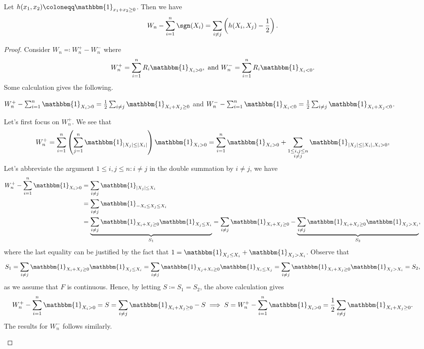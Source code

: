 \begin{proposition}\label{prop:Wilcoxon-signed-rank-test}
	Let \(h(x_1, x_2) \coloneqq \mathbbm{1}_{x_1 + x_2 \geq 0}\). Then we have
	\[
		W_n - \sum_{i=1}^{n} \sgn (X_i)
		= \sum_{i \neq j} \left( h(X_i , X_j) - \frac{1}{2} \right).
	\]
\end{proposition}
\begin{proof}
	Consider \(W_n \eqqcolon W_n^+ - W_n^-\) where
	\[
		W_n^+ = \sum_{i=1}^{n} R_i \mathbbm{1}_{X_i > 0} ,\text{ and }
		W_n^- = \sum_{i=1}^{n} R_i \mathbbm{1}_{X_i < 0}.
	\]
	Some calculation gives the following.

	\begin{claim}
		\(W_n^+ - \sum_{i=1}^{n} \mathbbm{1}_{X_i > 0} = \frac{1}{2} \sum_{i \neq j} \mathbbm{1}_{X_i + X_j \geq 0}\) and \(W_n^- - \sum_{i=1}^{n} \mathbbm{1}_{X_i < 0} = \frac{1}{2} \sum_{i \neq j} \mathbbm{1}_{X_i + X_j < 0}\).
	\end{claim}
	\begin{explanation}
		Let's first focus on \(W_n^+\). We see that
		\[
			W_n^+
			= \sum_{i=1}^{n} \left( \sum_{j=1}^{n} \mathbbm{1}_{\vert X_j \vert \leq \vert X_i \vert } \right) \mathbbm{1}_{X_i > 0}
			= \sum_{i=1}^{n} \mathbbm{1}_{X_i > 0} + \sum_{\substack{1 \leq i, j \leq n \\ i \neq j}} \mathbbm{1}_{\vert X_j \vert \leq \vert X_i \vert , X_i > 0} ,
		\]
		Let's abbreviate the argument \(1 \leq i, j \leq n \colon i \neq j\) in the double summation by \(i \neq j\), we have
		\[
			\begin{split}
				W_n^+ - \sum_{i=1}^{n} \mathbbm{1}_{X_i > 0}
				 & = \sum_{i \neq j} \mathbbm{1}_{\vert X_j \vert \leq X_i}                                       \\
				 & = \sum_{i \neq j} \mathbbm{1}_{-X_i \leq X_j \leq X_i}                                         \\
				 & = \underbrace{\sum_{i \neq j} \mathbbm{1}_{X_i + X_j \geq 0} \mathbbm{1}_{X_j \leq X_i}}_{S_1}
				= \sum_{i \neq j} \mathbbm{1}_{X_i + X_j \geq 0} - \underbrace{\sum_{i \neq j} \mathbbm{1}_{X_i + X_j \geq 0} \mathbbm{1}_{X_j > X_i}}_{S_2},
			\end{split}
		\]
		where the last equality can be justified by the fact that \(1 = \mathbbm{1}_{X_j \leq X_i} + \mathbbm{1}_{X_j > X_i} \). Observe that
		\[
			S_1
			= \sum_{i \neq j} \mathbbm{1}_{X_i + X_j \geq 0} \mathbbm{1}_{X_j \leq X_i}
			= \sum_{i \neq j} \mathbbm{1}_{X_j + X_i \geq 0} \mathbbm{1}_{X_i \leq X_j}
			= \sum_{i \neq j} \mathbbm{1}_{X_i + X_j \geq 0} \mathbbm{1}_{X_j > X_i}
			= S_2,
		\]
		as we assume that \(F\) is continuous. Hence, by letting \(S \coloneqq S_1 = S_2\), the above calculation gives
		\[
			W_n^+ - \sum_{i=1}^{n} \mathbbm{1}_{X_i > 0}
			= S
			= \sum_{i \neq j} \mathbbm{1}_{X_i + X_j \geq 0} - S
			\implies S
			= W_n^+ - \sum_{i=1}^{n} \mathbbm{1}_{X_i > 0}
			= \frac{1}{2} \sum_{i \neq j} \mathbbm{1}_{X_i + X_j \geq 0}.
		\]
		The results for \(W_n^-\) follows similarly.
	\end{explanation}


\end{proof}
